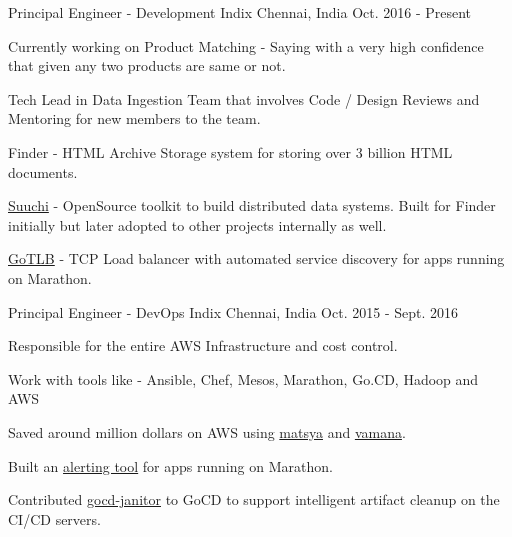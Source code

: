 

\begin{cventries}

  \cventry
    {Principal Engineer - Development} %
    {Indix} %
    {Chennai, India} %
    {Oct. 2016 - Present} %
    {
      \begin{cvitems} %
        \item {Currently working on Product Matching - Saying with a very high confidence that given any two products are same or not. }
        \item {Tech Lead in Data Ingestion Team that involves Code / Design Reviews and Mentoring for new members to the team. }
        \item {Finder - HTML Archive Storage system for storing over 3 billion HTML documents.}
        \item {\href{https://github.com/ashwanthkumar/suuchi}{Suuchi} - OpenSource toolkit to build distributed data systems. Built for Finder initially but later adopted to other projects internally as well. }
        \item {\href{https://github.com/ashwanthkumar/gotlb}{GoTLB} - TCP Load balancer with automated service discovery for apps running on Marathon. }
      \end{cvitems}
    }

  \cventry
    {Principal Engineer - DevOps} %
    {Indix} %
    {Chennai, India} %
    {Oct. 2015 - Sept. 2016} %
    {
      \begin{cvitems} %
        \item {Responsible for the entire AWS Infrastructure and cost control. }
        \item {Work with tools like - Ansible, Chef, Mesos, Marathon, Go.CD, Hadoop and AWS}
        \item {Saved around million dollars on AWS using \href{https://github.com/indix/matsya}{matsya} and \href{https://github.com/indix/vamana}{vamana}. }
        \item {Built an \href{https://github.com/ashwanthkumar/marathon-alerts}{alerting tool} for apps running on Marathon. }
        \item {Contributed \href{https://github.com/ashwanthkumar/gocd-janitor}{gocd-janitor} to GoCD to support intelligent artifact cleanup on the CI/CD servers. }
      \end{cvitems}
    }


\end{cventries}
